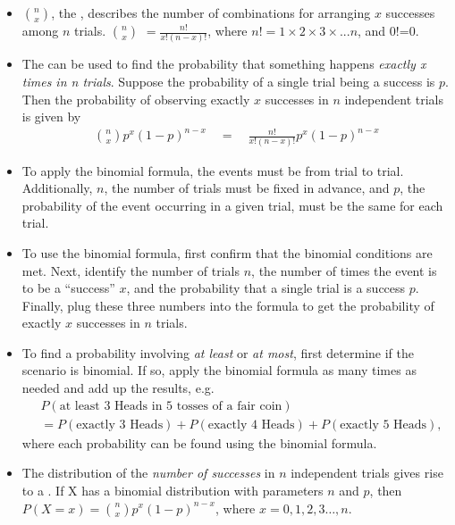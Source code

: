 \begin{itemize}
\item $n\choose x$, the , describes the number of combinations for arranging $x$ successes among $n$ trials.  $n\choose x$ $=\frac{n!}{x!(n-x)!}$, where $n!=1\times 2\times 3\times...n$, and $0!$=0.

\item The  can be used to find the probability that something happens \textit{exactly x times in n trials}.  Suppose the probability of a single trial being a success is $p$. Then the probability of observing exactly $x$ successes in $n$ independent trials is given by\vspace{-1mm}
\begin{eqnarray*}
{n\choose x}p^x(1-p)^{n-x}   \quad= \quad  \frac{n!}{x!(n-x)!}p^x(1-p)^{n-x}
\end{eqnarray*}

\item To apply the binomial formula, the events must be  from trial to trial.  Additionally, $n$, the number of trials must be fixed in advance, and $p$, the probability of the event occurring in a given trial, must be the same for each trial.

\item To use the binomial formula, first confirm that the binomial conditions are met.  Next, identify the number of trials $n$, the number of times the event is to be a ``success'' $x$, and the probability that a single trial is a success $p$. Finally, plug these three numbers into the formula to get the probability of exactly $x$ successes in $n$ trials.


\item
  To find a probability involving \emph{at least} or \emph{at most},
  first determine if the scenario is binomial.
  If so, apply the binomial formula as many times as needed and add
  up the results, e.g.
  \begin{align*}
  &P(\text{at least 3 Heads in 5 tosses of a fair coin}) \\
    &= P(\text{exactly 3 Heads})+P(\text{exactly 4 Heads})+P(\text{exactly 5 Heads}),
  \end{align*}
  where each probability can be found using the binomial formula.


\item The distribution of the \textit{number of successes} in $n$ independent trials gives rise to a .  If X has a binomial distribution with parameters $n$ and $p$, then \\
$P(X=x) = {n\choose x}p^x(1-p)^{n-x}$, where $x=0,1,2,3\dots,n$.


\end{itemize}
